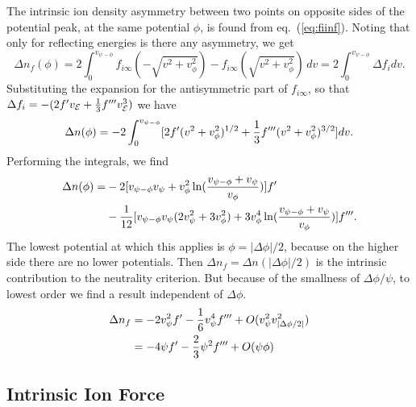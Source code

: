 \documentclass[12pt]{article}
\def\energy{{\cal E}}
\begin{document}
The intrinsic ion density asymmetry between two points on opposite
sides of the potential peak, at the same potential $\phi$, is found
from eq.\ (\ref{eq:fiinf}). Noting that only for reflecting energies
is there any asymmetry, we get
\begin{equation}
  \label{eq:Dnf}
  \Delta n_f(\phi)=2\int_0^{v_{\psi-\phi}} f_{i\infty}(-\sqrt{v^2+v_\phi^2})-
  f_{i\infty}(\sqrt{v^2+v_\phi^2})\,dv = 2\int_0^{v_{\psi-\phi}} \Delta f_i
  dv.
\end{equation}
 Substituting
the expansion for the antisymmetric part of $f_{i\infty}$, so that
$\Delta f_i= -(2f' v_\energy+{1\over 3}f'''v_\energy^3)$ we have
\begin{equation}
  \label{eq:nfexp}
  \Delta n(\phi)=-2\int_0^{v_{\psi-\phi}}[2f'(v^2+v_\phi^2)^{1/2}+{1\over 3}
  f'''(v^2+v_\phi^2)^{3/2}]dv.
\end{equation}
Performing the integrals, we find
\begin{equation}
  \label{eq:Dnint}
  \begin{split}
  \Delta n(\phi) =& -2[v_{\psi-\phi} v_\psi +v_\phi^2\ln({v_{\psi-\phi}+v_\psi\over v_\phi})]f'\\
  &-{1\over 12}[v_{\psi-\phi} v_\psi(2v_\psi^2+3v_\phi^2)+3v_\phi^4 \ln({v_{\psi-\phi}+v_\psi\over v_\phi})]f'''.
  \end{split}
\end{equation}
The lowest potential at which this applies is $\phi=|\Delta\phi|/2$,
because on the higher side there are no lower potentials. Then
$\Delta n_f=\Delta n(|\Delta\phi|/2)$ is the intrinsic contribution to the
neutrality criterion. But because of the smallness of $\Delta\phi/\psi$, to
lowest order we find a result independent of $\Delta\phi$.
\begin{equation}
  \label{eq:Dnint2}
  \begin{split}
  \Delta n_f&=-2v_\psi^2f'-{1\over 6} v_\psi^4f'''
  +O(v_\psi^2v_{|\Delta\phi/2|}^2)\\
  &=-4\psi f' -{2\over 3}\psi^2 f''' +O(\psi\phi)
  \end{split}
\end{equation}

\subsection{Intrinsic Ion Force}
\end{document}

